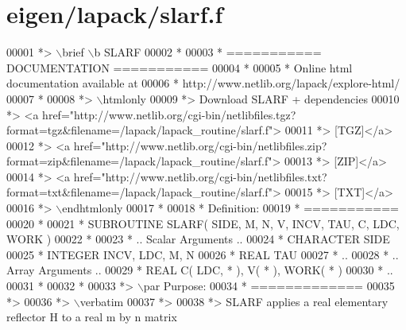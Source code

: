 \hypertarget{eigen_2lapack_2slarf_8f_source}{}\section{eigen/lapack/slarf.f}
\label{eigen_2lapack_2slarf_8f_source}

\begin{DoxyCode}
00001 \textcolor{comment}{*> \(\backslash\)brief \(\backslash\)b SLARF}
00002 \textcolor{comment}{*}
00003 \textcolor{comment}{*  =========== DOCUMENTATION ===========}
00004 \textcolor{comment}{*}
00005 \textcolor{comment}{* Online html documentation available at }
00006 \textcolor{comment}{*            http://www.netlib.org/lapack/explore-html/ }
00007 \textcolor{comment}{*}
00008 \textcolor{comment}{*> \(\backslash\)htmlonly}
00009 \textcolor{comment}{*> Download SLARF + dependencies }
00010 \textcolor{comment}{*> <a
       href="http://www.netlib.org/cgi-bin/netlibfiles.tgz?format=tgz&filename=/lapack/lapack\_routine/slarf.f"> }
00011 \textcolor{comment}{*> [TGZ]</a> }
00012 \textcolor{comment}{*> <a
       href="http://www.netlib.org/cgi-bin/netlibfiles.zip?format=zip&filename=/lapack/lapack\_routine/slarf.f"> }
00013 \textcolor{comment}{*> [ZIP]</a> }
00014 \textcolor{comment}{*> <a
       href="http://www.netlib.org/cgi-bin/netlibfiles.txt?format=txt&filename=/lapack/lapack\_routine/slarf.f"> }
00015 \textcolor{comment}{*> [TXT]</a>}
00016 \textcolor{comment}{*> \(\backslash\)endhtmlonly }
00017 \textcolor{comment}{*}
00018 \textcolor{comment}{*  Definition:}
00019 \textcolor{comment}{*  ===========}
00020 \textcolor{comment}{*}
00021 \textcolor{comment}{*       SUBROUTINE SLARF( SIDE, M, N, V, INCV, TAU, C, LDC, WORK )}
00022 \textcolor{comment}{* }
00023 \textcolor{comment}{*       .. Scalar Arguments ..}
00024 \textcolor{comment}{*       CHARACTER          SIDE}
00025 \textcolor{comment}{*       INTEGER            INCV, LDC, M, N}
00026 \textcolor{comment}{*       REAL               TAU}
00027 \textcolor{comment}{*       ..}
00028 \textcolor{comment}{*       .. Array Arguments ..}
00029 \textcolor{comment}{*       REAL               C( LDC, * ), V( * ), WORK( * )}
00030 \textcolor{comment}{*       ..}
00031 \textcolor{comment}{*  }
00032 \textcolor{comment}{*}
00033 \textcolor{comment}{*> \(\backslash\)par Purpose:}
00034 \textcolor{comment}{*  =============}
00035 \textcolor{comment}{*>}
00036 \textcolor{comment}{*> \(\backslash\)verbatim}
00037 \textcolor{comment}{*>}
00038 \textcolor{comment}{*> SLARF applies a real elementary reflector H to a real m by n matrix}

\end{DoxyCode}
